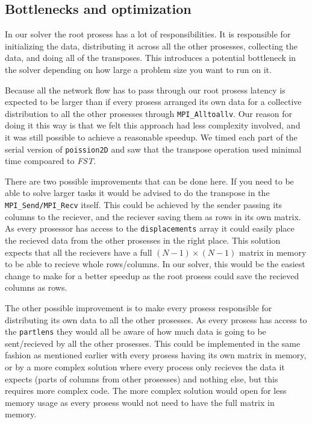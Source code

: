 
\subsection{Bottlenecks and optimization} %
\label{sub:bottlenecks_and_optimization}

In our solver the root prosess has a lot of responsibilities. It is responsible for initializing the data, distributing it across all the other prosesses, collecting the data, and doing all of the transposes. This introduces a potential bottleneck in the solver depending on how large a problem size you want to run on it. 

Because all the network flow has to pass through our root prosess latency is expected to be larger than if every prosess arranged its own data for a collective distribution to all the other prosesses through \texttt{MPI\_Alltoallv}. Our reason for doing it this way is that we felt this approach had less complexity involved, and it was still possible to achieve a reasonable speedup. We timed each part of the serial version of \texttt{poission2D} and saw that the transpose operation used minimal time compoared to \emph{FST}. 

There are two possible improvements that can be done here. If you need to be able to solve larger tasks it would be advised to do the transpose in the \texttt{MPI\_Send/MPI\_Recv} itself. This could be achieved by the sender passing its columns to the reciever, and the reciever saving them as rows in its own matrix. As every prosessor has access to the \texttt{displacements} array it could easily place the recieved data from the other prosesses in the right place. This solution expects that all the recievers have a full $(N-1)\times(N-1)$ matrix in memory to be able to recieve whole rows/columns. In our solver, this would be the easiest change to make for a better speedup as the root prosess could save the recieved columns as rows. 

The other possible improvement is to make every prosess responsible for distributing its own data to all the other prosesses. As every prosess has access to the \texttt{partlens} they would all be aware of how much data is going to be sent/recieved by all the other prosesses. This could be implemented in the same fashion as mentioned earlier with every prosess having its own matrix in memory, or by a more complex solution where every process only recieves the data it expects (parts of columns from other prosesses) and nothing else, but this requires more complex code. The more complex solution would open for less memory usage as every prosess would not need to have the full matrix in memory. 


